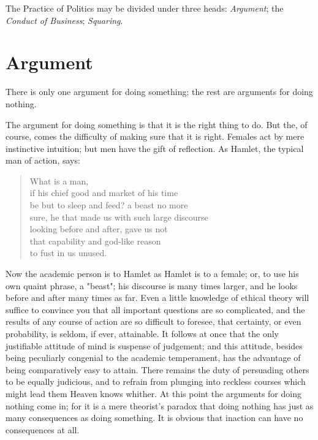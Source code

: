 \documentclass[12pt, oneside, b5paper]{memoir}
\begin{document}
The Practice of Politics may be divided under three heads: \emph{Argument}; the \emph{Conduct of Business}; \emph{Squaring}.

\chapter{Argument}

There is only one argument for doing something; the rest are arguments for doing nothing.

The argument for doing something is that it is the right thing to do. But the, of course, comes the difficulty of making sure that it is right. Females act by mere instinctive intuition; but men have the gift of reflection. As Hamlet, the typical man of action, says:

\begin{quote}
What is a man, \\ if his chief good and market of his time \\ be but to sleep and feed? a beast no more \\
sure, he that made us with such large discourse \\ looking before and after, gave us not \\ that capability and god-like reason \\ to fust in us unused.
\end{quote}

Now the academic person is to Hamlet as Hamlet is to a female; or, to use his own quaint phrase, a "beast"; his discourse is many times larger, and he looks before and after many times as far. Even a little knowledge of ethical theory will suffice to convince you that all important questions are so complicated, and the results of any course of action are so difficult to foresee, that certainty, or even probability, is seldom, if ever, attainable. It follows at once that the only justifiable attitude of mind is suspense of judgement; and this attitude, besides being peculiarly congenial to the academic temperament, has the advantage of being comparatively easy to attain. There remains the duty of persuading others to be equally judicious, and to refrain from plunging into reckless courses which might lead them Heaven knows whither. At this point the arguments for doing nothing come in; for it is a mere theorist's paradox that doing nothing has just as many consequences as doing something. It is obvious that inaction can have no consequences at all.
\end{document}
